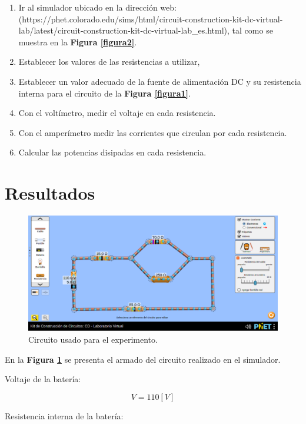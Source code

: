 \documentclass[letter,11pt]{article}
\begin{document}
\begin{enumerate}
\item Ir al simulador ubicado en la dirección web:
(https://phet.colorado.edu/sims/html/circuit-construction-kit-dc-virtual-lab/latest/circuit-construction-kit-dc-virtual-lab\_es.html),
tal como se muestra en la \textbf{Figura \ref{figura2}}.
\item Establecer los valores de las resistencias a utilizar,
\item Establecer un valor adecuado de la fuente de alimentación DC y su
    resistencia interna para el circuito de la \textbf{Figura \ref{figura1}}.
\item Con el voltímetro, medir el voltaje en cada resistencia.
\item Con el amperímetro medir las corrientes que circulan por cada resistencia.
\item Calcular las potencias disipadas en cada resistencia.
\end{enumerate}

\section{Resultados}

\begin{figure}[!h]
\centering
\includegraphics[scale=0.45]{resources/figura3.eps}
\caption{Circuito usado para el experimento.}
\label{figura3}
\end{figure}

En la \textbf{Figura \ref{figura3}} se presenta el armado del circuito realizado
en el simulador.

Voltaje de la batería:

\begin{equation*}
    V = 110 [V]
\end{equation*}

Resistencia interna de la batería:
\end{document}
